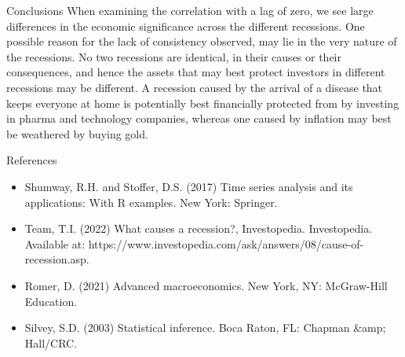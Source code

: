 \documentclass[11pt]{beamer}
\begin{document}
\begin{frame}{Conclusions}
When examining the correlation with a lag of zero, we see large differences in the economic significance across the different recessions.
One possible reason for the lack of consistency observed, may lie in the very nature of the recessions. No two recessions are identical, in their causes or their consequences, and hence the assets that may best protect investors in different recessions may be different. A recession caused by the arrival of a disease that keeps everyone at home is potentially best financially protected from by investing in pharma and technology companies, whereas one caused by inflation may best be weathered by buying gold.
\end{frame}
\begin{frame}{References}
    \begin{itemize}
        \item Shumway, R.H. and Stoffer, D.S. (2017) Time series analysis and its applications: With R examples. New York: Springer. 
        \item Team, T.I. (2022) What causes a recession?, Investopedia. Investopedia. Available at: https://www.investopedia.com/ask/answers/08/cause-of-recession.asp. 
        \item Romer, D. (2021) Advanced macroeconomics. New York, NY: McGraw-Hill Education. 
        \item Silvey, S.D. (2003) Statistical inference. Boca Raton, FL: Chapman &amp; Hall/CRC. 
    \end{itemize}
\end{frame}
\end{document}
